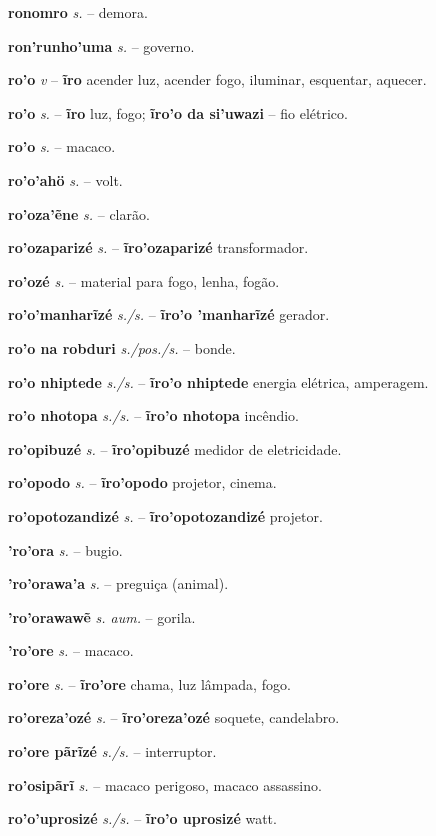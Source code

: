 \textbf{ronomro} \textit{s.} -- demora.

\textbf{ron'runho'uma} \textit{s.} -- governo.

\textbf{ro'o} \textit{v} -- \textbf{ĩro} acender luz, acender fogo, iluminar, esquentar, aquecer.

\textbf{ro'o} \textit{s.} -- \textbf{ĩro} luz, fogo; \textbf{ĩro'o da si'uwazi} -- fio elétrico.

\textbf{ro'o} \textit{s.} -- macaco.

\textbf{ro'o'ahö} \textit{s.} -- volt.

\textbf{ro'oza'ẽne} \textit{s.} -- clarão.

\textbf{ro'ozaparizé} \textit{s.} -- \textbf{ĩro'ozaparizé} transformador.

\textbf{ro'ozé} \textit{s.} -- material para fogo, lenha, fogão.

\textbf{ro'o'manharĩzé} \textit{s./s.} -- \textbf{ĩro'o 'manharĩzé} gerador.

\textbf{ro'o na robduri} \textit{s./pos./s.} -- bonde.

\textbf{ro'o nhiptede} \textit{s./s.} -- \textbf{ĩro'o nhiptede} energia elétrica, amperagem.

\textbf{ro'o nhotopa} \textit{s./s.} -- \textbf{ĩro'o nhotopa} incêndio.

\textbf{ro'opibuzé} \textit{s.} -- \textbf{ĩro'opibuzé} medidor de eletricidade.

\textbf{ro'opodo} \textit{s.} -- \textbf{ĩro'opodo} projetor, cinema.

\textbf{ro'opotozandizé} \textit{s.} -- \textbf{ĩro'opotozandizé} projetor.

\textbf{'ro'ora} \textit{s.} -- bugio.

\textbf{'ro'orawa'a} \textit{s.} -- preguiça (animal).

\textbf{'ro'orawawẽ} \textit{s. aum.} -- gorila.

\textbf{'ro'ore} \textit{s.} -- macaco.

\textbf{ro'ore} \textit{s.} -- \textbf{ĩro'ore} chama, luz lâmpada, fogo.

\textbf{ro'oreza'ozé} \textit{s.} -- \textbf{ĩro'oreza'ozé} soquete, candelabro.

\textbf{ro'ore pãrĩzé} \textit{s./s.} -- interruptor.

\textbf{ro'osipãrĩ} \textit{s.} -- macaco perigoso, macaco assassino.

\textbf{ro'o'uprosizé} \textit{s./s.} -- \textbf{ĩro'o uprosizé} watt.

